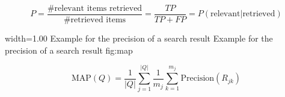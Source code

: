 \begin{equation}
  P = \frac{\text{\# relevant items retrieved}}{\text{\# retrieved items}} = \frac{TP}{TP + FP} = P(\text{relevant} | \text{retrieved})
\end{equation}

      {width=1.00\textwidth}
      {Example for the precision of a search result}
      {Example for the precision of a search result}
      {fig:map}

\begin{equation}
  \text{MAP}(Q) = \frac{1}{|Q|}\sum_{j = 1}^{|Q|} \frac{1}{m_j}\sum_{k = 1}^{m_j}\text{Precision}(R_{jk})
\end{equation}

